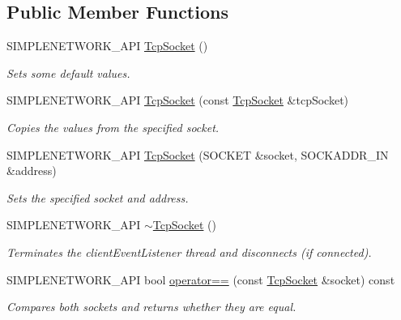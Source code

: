 \subsection*{Public Member Functions}
\begin{DoxyCompactItemize}
\item 
\mbox{\label{class_tcp_socket_a132aa72af141d611f8bad96ba585a79f}} 
S\+I\+M\+P\+L\+E\+N\+E\+T\+W\+O\+R\+K\+\_\+\+A\+PI \mbox{\hyperlink{class_tcp_socket_a132aa72af141d611f8bad96ba585a79f}{Tcp\+Socket}} ()
\begin{DoxyCompactList}\small\item\em Sets some default values. \end{DoxyCompactList}\item 
S\+I\+M\+P\+L\+E\+N\+E\+T\+W\+O\+R\+K\+\_\+\+A\+PI \mbox{\hyperlink{class_tcp_socket_aac5a96f2ac3a824fb7c52260a6a6c2bd}{Tcp\+Socket}} (const \mbox{\hyperlink{class_tcp_socket}{Tcp\+Socket}} \&tcp\+Socket)
\begin{DoxyCompactList}\small\item\em Copies the values from the specified socket. \end{DoxyCompactList}\item 
S\+I\+M\+P\+L\+E\+N\+E\+T\+W\+O\+R\+K\+\_\+\+A\+PI \mbox{\hyperlink{class_tcp_socket_adc173be5af51b5ead7ef1f370453c2d2}{Tcp\+Socket}} (S\+O\+C\+K\+ET \&socket, S\+O\+C\+K\+A\+D\+D\+R\+\_\+\+IN \&address)
\begin{DoxyCompactList}\small\item\em Sets the specified socket and address. \end{DoxyCompactList}\item 
\mbox{\label{class_tcp_socket_a4c6d246451c51ac4226a9301f6711086}} 
S\+I\+M\+P\+L\+E\+N\+E\+T\+W\+O\+R\+K\+\_\+\+A\+PI \mbox{\hyperlink{class_tcp_socket_a4c6d246451c51ac4226a9301f6711086}{$\sim$\+Tcp\+Socket}} ()
\begin{DoxyCompactList}\small\item\em Terminates the client\+Event\+Listener thread and disconnects (if connected). \end{DoxyCompactList}\item 
S\+I\+M\+P\+L\+E\+N\+E\+T\+W\+O\+R\+K\+\_\+\+A\+PI bool \mbox{\hyperlink{class_tcp_socket_a282abf062b6536eaa57e8ef7fec7a122}{operator==}} (const \mbox{\hyperlink{class_tcp_socket}{Tcp\+Socket}} \&socket) const
\begin{DoxyCompactList}\small\item\em Compares both sockets and returns whether they are equal. \end{DoxyCompactList}\item 

\end{DoxyCompactItemize}
